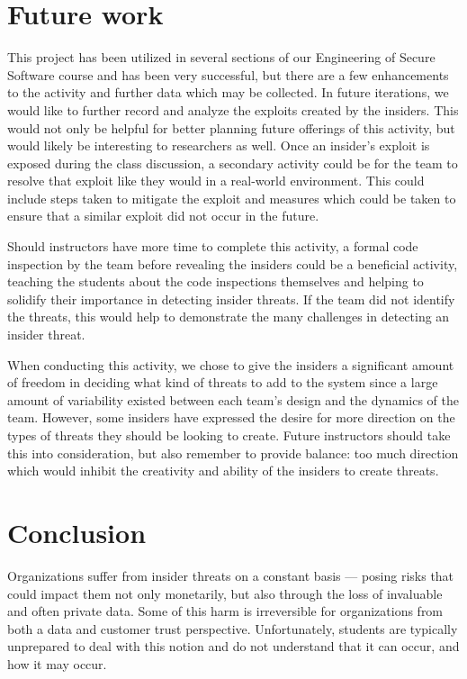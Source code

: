 \documentclass[conference]{IEEEtran}
\begin{document}


\section{Future work}
\label{sec: futurework}

This project has been utilized in several sections of our Engineering of Secure Software course and has been very successful, but there are a few enhancements to the activity and further data which may be collected. In future iterations, we would like to further record and analyze the exploits created by the insiders. This would not only be helpful for better planning future offerings of this activity, but would likely be interesting to researchers as well. Once an insider's exploit is exposed during the class discussion, a secondary activity could be for the team to resolve that exploit like they would in a real-world environment. This could include steps taken to mitigate the exploit and measures which could be taken to ensure that a similar exploit did not occur in the future.

Should instructors have more time to complete this activity, a formal code inspection by the team before revealing the insiders could be a beneficial activity, teaching the students about the code inspections themselves and helping to solidify their importance in detecting insider threats. If the team did not identify the threats, this would help to demonstrate the many challenges in detecting an insider threat.

When conducting this activity, we chose to give the insiders a significant amount of freedom in deciding what kind of threats to add to the system since a large amount of variability existed between each team's design and the dynamics of the team. However, some insiders have expressed the desire for more direction on the types of threats they should be looking to create. Future instructors should take this into consideration, but also remember to provide balance: too much direction which would inhibit the creativity and ability of the insiders to create threats.

\section{Conclusion}
\label{sec: conclusion}

Organizations suffer from insider threats on a constant basis --- posing risks that could impact them not only monetarily, but also through the loss of invaluable and often private data. Some of this harm is irreversible for organizations from both a data and customer trust perspective. Unfortunately, students are typically unprepared to deal with this notion and do not understand that it can occur, and how it may occur.
\end{document}
